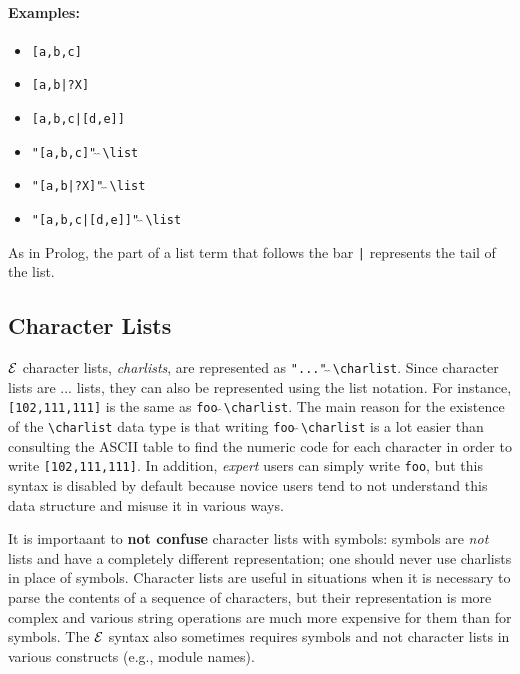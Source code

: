 \documentclass[11pt]{article}
\newcommand{\ERGO}{\mbox{\ensuremath{\cal{E}}\smaller{{\sc{RGO}}}}\xspace}
\newcommand{\FLSYSTEM}{\ERGO}
\newcommand{\bs}{\textbackslash}
\newcommand{\dq}{\symbol{34}}
\begin{document}
\paragraph{Examples:}
\begin{itemize}
\item {\tt [a,b,c]} 
\item {\tt [a,b|?X]}  
\item {\tt [a,b,c|[d,e]]} 
\item {\tt "[a,b,c]"$\hat{~}\hat{~}$\bs{}list} 
\item {\tt "[a,b|?X]"$\hat{~}\hat{~}$\bs{}list}  
\item {\tt "[a,b,c|[d,e]]"$\hat{~}\hat{~}$\bs{}list} 
\end{itemize}
As in Prolog, the part of a list term that follows the bar \verb,|,
represents the tail of the list.

\subsection{Character Lists}\label{sec-charlists}
\index{\bs{}charlist}
\FLSYSTEM character lists, \emph{charlists},
are represented as \texttt{"..."$\hat{~}\hat{~}$\bs{}charlist}. 
Since character lists are ... lists, they can also be represented using the
list notation. For instance,
\mbox{\texttt{[102,111,111]}} is the same as
\texttt{{\dq}foo{\dq}$\hat{~}\hat{~}$\bs{}charlist}.
The main reason for the existence of the \texttt{\bs{}charlist} data type
is that writing
\texttt{{\dq}foo{\dq}$\hat{~}\hat{~}$\bs{}charlist} is a lot easier than 
consulting the ASCII table to find the numeric code for each character
in order to write \mbox{\texttt{[102,111,111]}}.
In addition, \emph{expert} users can simply write
\texttt{{\dq}foo{\dq}}, but this syntax is disabled by default because
novice users tend to not understand this data structure and misuse it
in various ways.

It is importaant to
\textbf{not confuse} character lists with symbols: symbols are
\emph{not} lists and have a completely different representation; one
should never use charlists in place of symbols. 
Character lists are
useful in situations when it is necessary to parse the contents of a
sequence of characters, but their representation is more complex and
various string operations are much more expensive for them than for symbols.
The \FLSYSTEM syntax also sometimes requires symbols and not character
lists in various constructs (e.g., module names).
\end{document}
